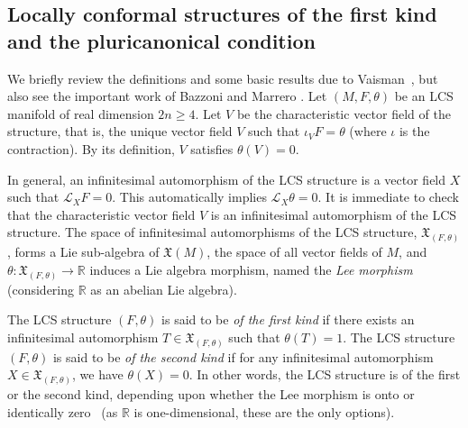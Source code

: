 \documentclass[a4paper,11pt]{amsart}
\theoremstyle{definition}
\renewcommand{\[}{\begin{equation*}}
\renewcommand{\]}{\end{equation*}}
\begin{document}
\subsection{Locally conformal structures of the first kind and the pluricanonical condition}

We briefly review the definitions and some basic results due to Vaisman~\cite{MR418003}, but also see the important work of Bazzoni and Marrero \cite{MR3767426}. Let $(M, F, \theta)$ be an LCS manifold of real dimension $2n \geq 4$.
Let $V$ be the characteristic vector field of the structure, that is, the unique vector field $V$ such that 
$ \iota_V F = \theta$ (where $\iota$ is the contraction). By its definition, $V$ satisfies $\theta(V) = 0$.

In general, an infinitesimal automorphism of the LCS structure is a vector field $X$ such that $\mathcal{L}_X F = 0$. This automatically implies $\mathcal{L}_X \theta = 0$. It is immediate to check that the characteristic vector field $V$ is an infinitesimal automorphism of the LCS structure. The space of infinitesimal automorphisms of the LCS structure, $\mathfrak{X}_{(F,\theta)}$, forms a Lie sub-algebra of $\mathfrak{X}(M)$, the space of all vector fields of $M$, and $\theta :\mathfrak{X}_{(F,\theta)} \rightarrow \mathbb{R}$ induces a Lie algebra morphism, named the {\it Lee morphism} (considering $\mathbb{R}$ as an abelian Lie algebra).

The LCS structure $(F, \theta)$ is said to be {\it of the first kind} if there exists an infinitesimal automorphism $T \in \mathfrak{X}_{(F,\theta)} $ such that $\theta(T) = 1$. The LCS structure $(F, \theta)$ is said to be {\it of the second kind} if for any infinitesimal automorphism $X \in \mathfrak{X}_{(F,\theta)} $, we have $\theta(X) = 0$. In other words, the LCS structure is of the first or the second kind, depending upon whether the Lee morphism is onto or identically zero~\cite{MR809073} (as $\mathbb{R}$ is one-dimensional, these are the only options).
\end{document}
